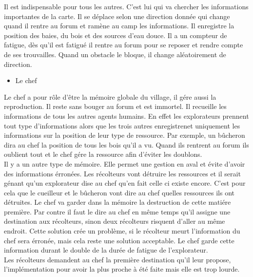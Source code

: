 \documentclass[12pt]{article}
\begin{document}
Il est indispensable pour tous les autres. C'est lui qui va chercher les 
informations importantes de la carte. Il se déplace selon une direction donnée 
qui change quand il rentre au forum et ramène au camp les informations. Il 
enregistre la position des baies, du bois et des sources d'eau douce. Il a un 
compteur de fatigue, dès qu'il est fatigué il rentre au forum pour se reposer 
et rendre compte de ses trouvailles. Quand un obstacle le bloque, il change 
aléatoirement de direction.\\

		\begin{itemize}
		\item Le chef\\
		\end{itemize}

Le chef a pour rôle d'être la mémoire globale du village, il gére aussi la 
reproduction. Il reste sans bouger au forum et est immortel. Il recueille les 
informations de tous les autres agents humains. En effet les explorateurs 
prennent tout type d'informations alors que les trois autres enregistrenet 
uniquement les informations sur la position de leur type de ressource. Par 
exemple, un bûcheron dira au chef la position de tous les bois qu'il a vu. 
Quand ils rentrent au forum ils oublient tout et le chef gére la ressource 
afin d'éviter les doublons.\\

Il y a un autre type de mémoire. Elle permet une gestion en aval et évite 
d'avoir des informations érronées. Les récolteurs vont détruire les ressources 
et il serait génant qu'un explorateur dise au chef qu'en fait celle ci existe 
encore. C'est pour cela que le cueilleur et le bûcheron vont dire au chef 
quelles ressources ils ont détruites. Le chef va garder dans la mémoire la 
destruction de cette matiére première. Par contre il faut le dire au chef 
en même temps qu'il assigne une destination aux récolteurs, sinon deux 
récolteurs risquent d'aller au même endroit. Cette solution crée un problème, 
si le récolteur meurt l'information du chef sera érronée, mais cela reste 
une solution acceptable. Le chef garde cette information durant le double de 
la durée de fatigue de l'explorateur.\\

Les récolteurs demandent au chef la première destination qu'il leur propose, 
l'implémentation pour avoir la plus proche à été faite mais elle est trop 
lourde.\\
\end{document}
